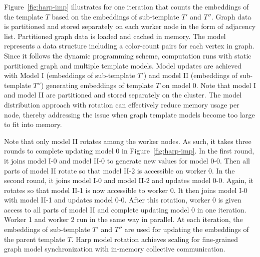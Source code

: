 Figure~\ref{fig:harp-imp} illustrates \harpsahad{} for one iteration
that counts the embeddings of the template $T$ based on the embeddings of
sub-template $T'$ and $T''$.  Graph data is partitioned and stored separately on
each worker node in the form of adjacency list. Partitioned graph data is loaded
and cached in memory. The model represents a data structure including a
color-count pairs for each vertex in graph. Since it follows the dynamic
programming scheme, computation runs with static partitioned graph and multiple
template models. Model updates are achieved with Model I (embeddings of
sub-template $T'$) and model II (embeddings of sub-template $T''$) generating
embeddings of template $T$ on model 0. Note that model I and model II are
partitioned and stored separately on the cluster. The model distribution
approach with rotation can effectively reduce memory usage per node, thereby
addressing the issue when graph template models become too large to fit into
memory.


Note that only model II rotates among the worker nodes. As such, it takes three
rounds to complete updating model 0 in Figure~\ref{fig:harp-imp}. In the first round, 
it joins model I-0 and model II-0 to generate new values for model 0-0. Then all
parts of model II
rotate so that model II-2 is accessible on worker 0. In the second round, it
joins model I-0 and model II-2 and updates model 0-0. Again, it rotates so that
model II-1 is now accessible to worker 0. It then joins model I-0 with model II-1
and updates model 0-0. After this rotation, worker 0 is given access to all
parts of model II and complete updating model 0 in one iteration. Worker 1
and worker 2 run in the same way in parallel. At each iteration, the embeddings 
of sub-template $T'$ and $T''$ are used for updating the embeddings of the parent 
template $T$. Harp model rotation achieves scaling for fine-grained graph
model synchronization with in-memory collective communication.

